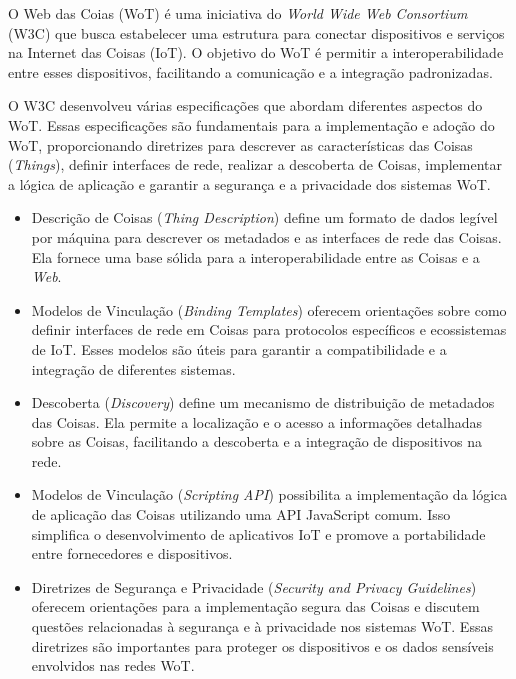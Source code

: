 O Web das Coias (WoT) é uma iniciativa do \textit{World Wide Web Consortium} (W3C) que busca estabelecer uma estrutura para conectar dispositivos e serviços na Internet das Coisas (IoT). O objetivo do WoT é permitir a interoperabilidade entre esses dispositivos, facilitando a comunicação e a integração padronizadas.

O W3C desenvolveu várias especificações que abordam diferentes aspectos do WoT. Essas especificações são fundamentais para a implementação e adoção do WoT, proporcionando diretrizes para descrever as características das Coisas (\textit{Things}), definir interfaces de rede, realizar a descoberta de Coisas, implementar a lógica de aplicação e garantir a segurança e a privacidade dos sistemas WoT.

\begin{itemize}
    \item Descrição de Coisas (\textit{Thing Description})  define um formato de dados legível por máquina para descrever os metadados e as interfaces de rede das Coisas. Ela fornece uma base sólida para a interoperabilidade entre as Coisas e a \textit{Web}.
    \item Modelos de Vinculação (\textit{Binding Templates})  oferecem orientações sobre como definir interfaces de rede em Coisas para protocolos específicos e ecossistemas de IoT. Esses modelos são úteis para garantir a compatibilidade e a integração de diferentes sistemas.
    \item Descoberta (\textit{Discovery})  define um mecanismo de distribuição de metadados das Coisas. Ela permite a localização e o acesso a informações detalhadas sobre as Coisas, facilitando a descoberta e a integração de dispositivos na rede.
    \item Modelos de Vinculação (\textit{Scripting API})  possibilita a implementação da lógica de aplicação das Coisas utilizando uma API JavaScript comum. Isso simplifica o desenvolvimento de aplicativos IoT e promove a portabilidade entre fornecedores e dispositivos.
    \item Diretrizes de Segurança e Privacidade (\textit{Security and Privacy Guidelines})  oferecem orientações para a implementação segura das Coisas e discutem questões relacionadas à segurança e à privacidade nos sistemas WoT. Essas diretrizes são importantes para proteger os dispositivos e os dados sensíveis envolvidos nas redes WoT.
\end{itemize}

